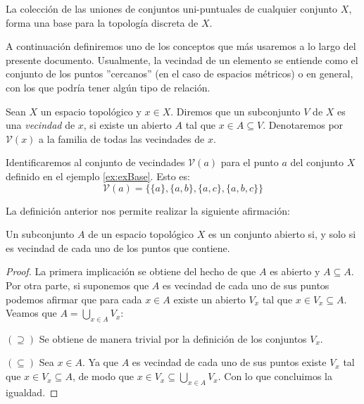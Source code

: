 \begin{example}\label{ex:conUnipuntuales}
La colección de las uniones de conjuntos uni-puntuales de cualquier conjunto $X$, forma una base para la topología discreta de $X$.
\end{example}

A continuación definiremos uno de los conceptos que más usaremos a lo largo del presente documento. Usualmente, la vecindad de un elemento se entiende como el conjunto de los puntos ''cercanos'' (en el caso de espacios métricos) o en general, con los que podría tener algún tipo de relación. 

\begin{definition}\label{def:vecindad}
Sean $X$ un espacio topológico y $x\in X$. Diremos que un subconjunto $V$ de $X$ es una \textit{vecindad} de $x$, si existe un abierto $A$ tal que $x\in A\subseteq V$. Denotaremos por $\mathcal{V}(x)$ a la familia de todas las vecindades de $x$.
\end{definition}

\begin{example}\label{ex:sisVecindades}
Identificaremos al conjunto de vecindades $\mathcal{V}(a)$ para el punto $a$ del conjunto $X$ definido en el ejemplo \ref{ex:exBase}. Esto es:
$$\mathcal{V}(a)=\{\{a\},\{a,b\},\{a,c\},\{a,b,c\}\}$$
\end{example}

La definición anterior nos permite realizar la siguiente afirmación:

\begin{teorema}\label{teo:abiertoImplicaVecindad}
Un subconjunto $A$ de un espacio topológico $X$ es un conjunto abierto si, y solo si es vecindad de cada uno de los puntos que contiene.
\end{teorema}
\begin{proof}
La primera implicación se obtiene del hecho de que $A$ es abierto y $A\subseteq A$. Por otra parte, si suponemos que $A$ es vecindad de cada uno de sus puntos podemos afirmar que para cada $x\in A$ existe un abierto $V_x$ tal que $x\in V_x\subseteq A$. Veamos que $A=\bigcup_{x\in A}V_x$:

$(\supseteq)$ Se obtiene de manera trivial por la definición de los conjuntos $V_x$.

$(\subseteq)$ Sea $x\in A$. Ya que $A$ es vecindad de cada uno de sus puntos existe $V_x$ tal que $x\in V_x\subseteq A$, de modo que $x\in V_x\subseteq\bigcup_{x\in A}V_x$. Con lo que concluimos la igualdad.
\end{proof}

